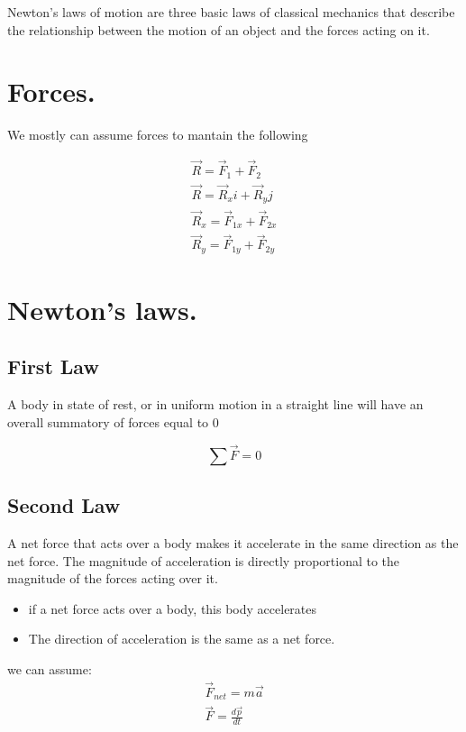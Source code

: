 \documentclass[11pt,fleqn]{book} %
\begin{document}
Newton's laws of motion are three basic laws of classical mechanics that describe the relationship between the motion of an object and the forces acting on it.

\section{Forces.}

We mostly can assume forces to mantain the following

\begin{gather}
    \vec{R} = \vec{F}_1 + \vec{F}_2\\
    \vec{R} = \vec{R}_x i + \vec{R}_y j\\
    \vec{R}_x = \vec{F}_{1x} + \vec{F}_{2x} \\
    \vec{R}_y = \vec{F}_{1y} + \vec{F}_{2y}
\end{gather}

\section{Newton's laws.}

\subsection{First Law}

A body in state of rest, or in uniform motion in a straight line
will have an overall summatory of forces equal to 0

\begin{equation}
    \sum \vec{F} = 0
\end{equation}

\subsection{Second Law}

A net force that acts over a body makes it accelerate in the same direction
as the net force. The magnitude of acceleration is directly proportional
to the magnitude of the forces acting over it.

\begin{itemize}
    \item if a net force acts over a body, this body accelerates
    \item The direction of acceleration is the same as a net force.
\end{itemize}

we can assume:
\begin{gather}
    \vec{F}_{net} = m \vec{a} \\
    \vec{F} = \frac{d \vec{p}}{dt} 
\end{gather}
\end{document}
